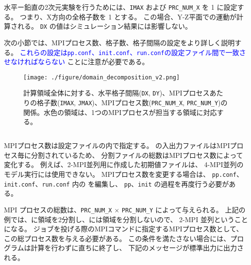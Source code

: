 水平ー鉛直の2次元実験を行うためには、\texttt{IMAX} および \texttt{PRC\_NUM\_X} を 1 に設定する。
つまり、X方向の全格子数を 1 とする。
この場合、Y-Z平面での運動が計算される。
\texttt{DX} の値はシミュレーション結果には影響しない。

次の小節では、MPIプロセス数、格子数、格子間隔の設定をより詳しく説明する。
\textcolor{blue}{これらの設定は\texttt{pp.conf}、\texttt{init.conf}、\texttt{run.conf}の設定ファイル間で一致させなければならない}
ことに注意が必要である。

\begin{figure}[h]
\begin{center}
  \texttt{[image: ./figure/domain\_decomposition\_v2.png]}\\
  \caption{計算領域全体に対する、水平格子間隔(\texttt{DX}, \texttt{DY})、MPIプロセスあたりの格子数(\texttt{IMAX}, \texttt{JMAX})、MPIプロセス数(\texttt{PRC\_NUM\_X}, \texttt{PRC\_NUM\_Y})の関係。水色の領域は、1つのMPIプロセスが担当する領域に対応する。}
  \label{fig:domain}
\end{center}
\end{figure}

\subsection{\SubsecMPIProcess} \label{subsec:relation_dom_reso2}

MPIプロセス数は設定ファイルの内で指定する。
\scalerm の入出力ファイルはMPIプロセス毎に分割されているため、
分割ファイルの総数はMPIプロセス数によって変化する。
例えば、2-MPI並列用に作成した初期値ファイルは、
4-MPI並列のモデル実行には使用できない。
MPIプロセス数を変更する場合は、
\verb|pp.conf|、\verb|init.conf|、\verb|run.conf| 内の
を編集し、
\verb|pp|、\verb|init| の過程を再度行う必要がある。

MPI プロセスの総数は、\verb|PRC_NUM_X| $\times$ \verb|PRC_NUM_Y|  によって与えられる。
上記の例では、\XDIR に領域を2分割し、\YDIR には領域を分割しないので、
2-MPI 並列ということになる。
ジョブを投げる際のMPIコマンドに指定するMPIプロセス数として、この総プロセス数を与える必要がある。
この条件を満たさない場合には、プログラムは計算を行わずに直ちに終了し、
下記のメッセージが標準出力に出力される。

